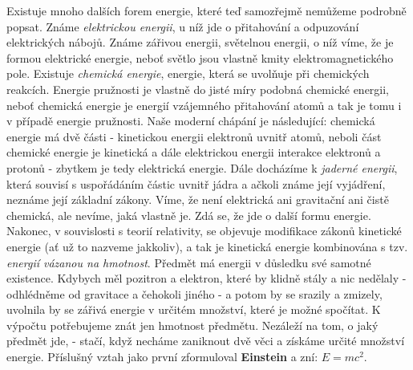 {    Existuje mnoho dalších forem energie, které teď samozřejmě nemůžeme podrobně popsat. Známe 
    \emph{elektrickou energii}, u níž jde o přitahování a odpuzování elektrických nábojů. Známe 
    zářivou energii, světelnou energii, o níž víme, že je formou elektrické energie, neboť světlo 
    jsou vlastně kmity elektromagnetického pole. Existuje \emph{chemická energie}, energie, která 
    se uvolňuje při chemických reakcích. Energie pružnosti je vlastně do jisté míry podobná 
    chemické energii, neboť chemická energie je energií vzájemného přitahování atomů a tak je tomu 
    i v případě energie pružnosti. Naše moderní chápání je následující: chemická energie má dvě 
    části - kinetickou energii elektronů uvnitř atomů, neboli část chemické energie je kinetická a 
    dále elektrickou energii interakce elektronů a protonů - zbytkem je tedy elektrická energie. 
    Dále docházíme k \emph{jaderné energii}, která souvisí s uspořádáním částic uvnitř jádra a 
    ačkoli známe její vyjádření, neznáme její základní zákony. Víme, že není elektrická ani 
    gravitační ani čistě chemická, ale nevíme, jaká vlastně je. Zdá se, že jde o další formu 
    energie. Nakonec, v souvislosti s teorií relativity, se objevuje modifikace zákonů kinetické 
    energie (ať už to nazveme jakkoliv), a tak je kinetická energie kombinována s tzv. 
    \emph{energií vázanou na hmotnost}. Předmět má energii v důsledku své samotné existence. 
    Kdybych měl pozitron a elektron, které by klidně stály a nic nedělaly - odhlédněme od gravitace 
    a čehokoli jiného - a potom by se srazily a zmizely, uvolnila by se zářivá energie v určitém 
    množství, které je možné spočítat. K výpočtu potřebujeme znát jen hmotnost předmětu. Nezáleží 
    na tom, o jaký předmět jde, - stačí, když necháme zaniknout dvě věci a získáme určité množství 
    energie. Příslušný vztah jako první zformuloval \textbf{Einstein} a zní: \(E = mc^2\).
    
}

